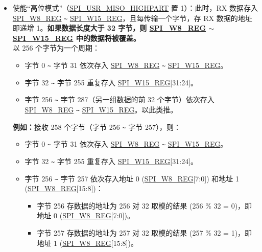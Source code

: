 \documentclass[main\_\_CN.tex]{subfiles}
\begin{document}
\begin{itemize}
\begin{itemize}
        \item 使能“高位模式”（\hyperref[fielddesc:SPIUSRMISOHIGHPART]{SPI\_USR\_MISO\_HIGHPART} 置 1）：此时，RX 数据存入 \hyperref[regdesc:SPIW8REG]{SPI\_W8\_REG} \verb+~+ \hyperref[regdesc:SPIW15REG]{SPI\_W15\_REG}，且每传输一个字节，存 RX 数据的地址即递增 1。\textbf{如果数据长度大于 32 字节，则 \hyperref[regdesc:SPIW8REG]{SPI\_W8\_REG} $\sim$ \hyperref[regdesc:SPIW15REG]{SPI\_W15\_REG} 中的数据将被覆盖。}\\
        以 256 个字节为一个周期：
        \begin{itemize}
            \item 字节 0 \verb+~+ 字节 31 依次存入 \hyperref[regdesc:SPIW8REG]{SPI\_W8\_REG} \verb+~+ \hyperref[regdesc:SPIW15REG]{SPI\_W15\_REG}。
            \item 字节 32 \verb+~+ 字节 255 重复存入 \hyperref[regdesc:SPIW15REG]{SPI\_W15\_REG}[31:24]。
            \item 字节 256 \verb+~+ 字节 287（另一组数据的前 32 个字节）依次存入 \hyperref[regdesc:SPIW8REG]{SPI\_W8\_REG} \verb+~+ \hyperref[regdesc:SPIW15REG]{SPI\_W15\_REG}。以此类推。
        \end{itemize}
        \textbf{例如：}接收 258 个字节（字节 256 \verb+~+ 字节 257），则：
        \begin{itemize}
            \item 字节 0 \verb+~+ 字节 31 依次存入 \hyperref[regdesc:SPIW8REG]{SPI\_W8\_REG} \verb+~+ \hyperref[regdesc:SPIW15REG]{SPI\_W15\_REG}。
            \item 字节 32 \verb+~+ 字节 255 重复存入 \hyperref[regdesc:SPIW15REG]{SPI\_W15\_REG}[31:24]。
            \item 字节 256 \verb+~+ 字节 257 依次存入地址 0 (\hyperref[regdesc:SPIW8REG]{SPI\_W8\_REG}[7:0]) 和地址 1 (\hyperref[regdesc:SPIW8REG]{SPI\_W8\_REG}[15:8])：
            \begin{itemize}
                \item 字节 256 存数据的地址为 256 对 32 取模的结果 (256 \% 32 = 0)，即地址 0 (\hyperref[regdesc:SPIW8REG]{SPI\_W8\_REG}[7:0])。
                \item 字节 257 存数据的地址为 257 对 32 取模的结果 (257 \% 32 = 1)，即地址 1 (\hyperref[regdesc:SPIW8REG]{SPI\_W8\_REG}[15:8])。
            \end{itemize}
        \end{itemize}
    \end{itemize}
\end{itemize}
\end{document}
